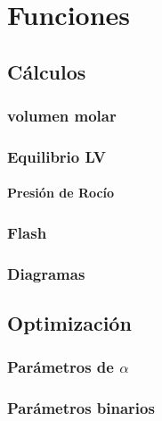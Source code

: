 \chapter{Funciones}
	\section{Cálculos}

		
		
		
		
		
		
		\newpage
		\thispagestyle{plain}
		\mbox{}

		\subsection{volumen molar}
		\subsection{Equilibrio LV}
		
		
		
		
		\subsubsection{Presión de Rocío}
		\subsection{Flash}
		

		
		\subsection{Diagramas}
	\section{Optimización}	
		\subsection{Parámetros de $\alpha$}
		\subsection{Parámetros binarios}
